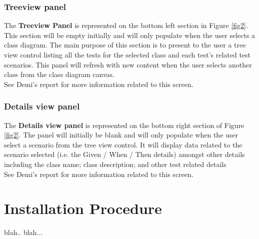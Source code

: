 \documentclass[a4paper,12pt]{article}
\begin{document}
\subsubsection{Treeview panel}
The \textbf{Treeview Panel} is represented on the bottom left section in Figure \ref{fig2}. This section will be empty initially and will only populate when the user selects a class diagram. The main purpose of this section is to present to the user a tree view control listing all the tests for the selected class and each test's related test scenarios. This panel will refresh with new content when the user selects another class from the class diagram canvas.\\
\linebreak
See Demi’s\cite{demi} report for more information related to this screen.

\subsubsection{Details view panel}
The \textbf{Details view panel} is represented on the bottom right section of Figure \ref{fig2}. The panel will initially be blank and will only populate when the user select a scenario from the tree view control. It will display data related to the scenario selected (i.e. the Given / When / Then details) amongst other details including the class name; class description; and other test related details\\
\linebreak
See Demi’s\cite{demi} report for more information related to this screen.

\section{Installation Procedure}
blah.. blah...
\end{document}
